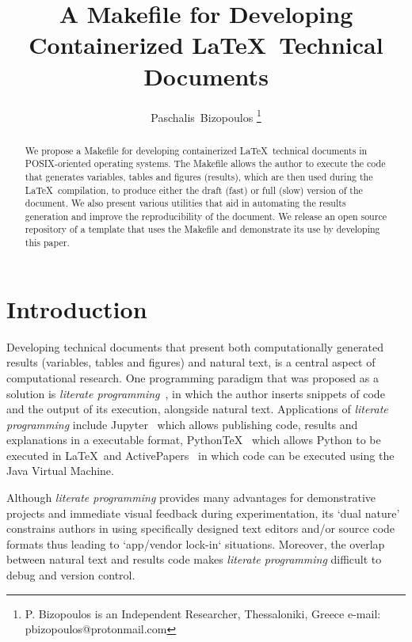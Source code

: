 \documentclass[journal]{IEEEtran}
\begin{document}

\title{A Makefile for Developing Containerized \LaTeX\ Technical Documents}

\author{Paschalis~Bizopoulos
\thanks{P. Bizopoulos is an Independent Researcher, Thessaloniki, Greece e-mail: pbizopoulos@protonmail.com}}

\maketitle

\begin{abstract}
	We propose a Makefile for developing containerized \LaTeX\ technical documents in POSIX-oriented operating systems.
	The Makefile allows the author to execute the code that generates variables, tables and figures (results), which are then used during the \LaTeX\ compilation, to produce either the draft (fast) or full (slow) version of the document.
	We also present various utilities that aid in automating the results generation and improve the reproducibility of the document.
	We release an open source repository of a template that uses the Makefile and demonstrate its use by developing this paper.
\end{abstract}

\section{Introduction}
Developing technical documents that present both computationally generated results (variables, tables and figures) and natural text, is a central aspect of computational research.
One programming paradigm that was proposed as a solution is \textit{literate programming}~\cite{knuth1984literate}, in which the author inserts snippets of code and the output of its execution, alongside natural text.
Applications of \textit{literate programming} include Jupyter~\cite{kluyver2016jupyter} which allows publishing code, results and explanations in a executable format, PythonTeX~\cite{poore2015pythontex} which allows Python to be executed in \LaTeX\ and ActivePapers~\cite{hinsen2014activepapers} in which code can be executed using the Java Virtual Machine.

Although \textit{literate programming} provides many advantages for demonstrative projects and immediate visual feedback during experimentation, its `dual nature' constrains authors in using specifically designed text editors and/or source code formats thus leading to `app/vendor lock-in` situations.
Moreover, the overlap between natural text and results code makes \textit{literate programming} difficult to debug and version control.
\end{document}
